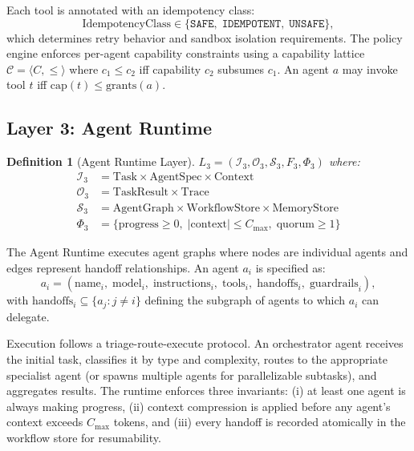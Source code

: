 \documentclass[11pt]{article}
\newtheorem{definition}{Definition}
\begin{document}
Each tool is annotated with an idempotency class:
\begin{equation}
    \text{IdempotencyClass} \in \{\texttt{SAFE},\; \texttt{IDEMPOTENT},\;
                                   \texttt{UNSAFE}\},
\end{equation}
which determines retry behavior and sandbox isolation requirements. The policy
engine enforces per-agent capability constraints using a capability lattice
$\mathcal{C} = \langle C, \leq \rangle$ where $c_1 \leq c_2$ iff capability
$c_2$ subsumes $c_1$. An agent $a$ may invoke tool $t$ iff $\text{cap}(t) \leq
\text{grants}(a)$.

\subsection{Layer 3: Agent Runtime}

\begin{definition}[Agent Runtime Layer]
    $L_3 = \left(\mathcal{I}_3, \mathcal{O}_3, \mathcal{S}_3, F_3, \Phi_3\right)$ where:
    \begin{align*}
        \mathcal{I}_3 &= \text{Task} \times \text{AgentSpec} \times \text{Context} \\
        \mathcal{O}_3 &= \text{TaskResult} \times \text{Trace} \\
        \mathcal{S}_3 &= \text{AgentGraph} \times \text{WorkflowStore} \times
                         \text{MemoryStore} \\
        \Phi_3 &= \{\text{progress} \geq 0,\; |\text{context}| \leq C_{\max},\;
                    \text{quorum} \geq 1\}
    \end{align*}
\end{definition}

The Agent Runtime executes agent graphs where nodes are individual agents and
edges represent handoff relationships. An agent $a_i$ is specified as:
\begin{equation}
    a_i = \left(\text{name}_i,\; \text{model}_i,\; \text{instructions}_i,\;
                 \text{tools}_i,\; \text{handoffs}_i,\; \text{guardrails}_i\right),
\end{equation}
with $\text{handoffs}_i \subseteq \{a_j : j \neq i\}$ defining the subgraph
of agents to which $a_i$ can delegate.

Execution follows a triage-route-execute protocol. An orchestrator agent
receives the initial task, classifies it by type and complexity, routes to the
appropriate specialist agent (or spawns multiple agents for parallelizable
subtasks), and aggregates results. The runtime enforces three invariants:
(i) at least one agent is always making progress, (ii) context compression is
applied before any agent's context exceeds $C_{\max}$ tokens, and (iii) every
handoff is recorded atomically in the workflow store for resumability.
\end{document}
